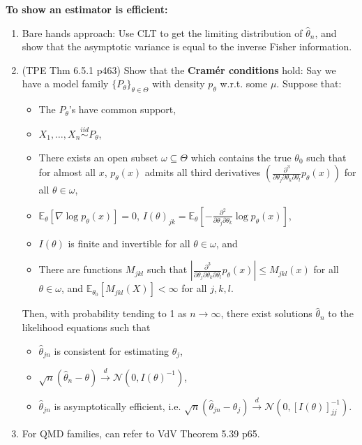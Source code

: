\documentclass[twoside]{article}
\newcommand{\dis}{\displaystyle}
\newcommand\bbE{\mathbb{E}}
\newcommand\calN{\mathcal{N}}
\newcommand\om{\omega}
\def\t{\theta}
\newcommand\T{\Theta}
\newcommand\cd{\stackrel{d}{\goesto}}
\newcommand\goesto{\rightarrow}
\begin{document}
\textbf{To show an estimator is efficient:}
\begin{enumerate}
\item Bare hands approach: Use CLT to get the limiting distribution of $\hat{\t}_n$, and show that the asymptotic variance is equal to the inverse Fisher information.

\item (TPE Thm 6.5.1 p463) Show that the \textbf{Cram\'{e}r conditions} hold: Say we have a model family $\{ P_\t\}_{\t \in \T}$ with density $p_\t$ w.r.t. some $\mu$. Suppose that: 
\begin{itemize}
\item The $P_\t$'s have common support, 
\item $X_1, \dots, X_n \stackrel{iid}{\sim} P_\t$,
\item There exists an open subset $\om \subseteq \T$ which contains the true $\t_0$ such that for almost all $x$, $p_\t(x)$ admits all third derivatives $\left( \dis\frac{\partial^3}{\partial \t_j \partial \t_k \partial \t_l} p_\t(x) \right)$ for all $\t \in \om$,
\item $\bbE_\t \left[ \nabla \log p_\t(x) \right] = 0$, $I(\t)_{jk} = \bbE_\t \left[ -\dis\frac{\partial^2}{\partial \t_j \partial \t_k} \log p_\t(x) \right]$,
\item $I(\t)$ is finite and invertible for all $\t \in \om$, and
\item There are functions $M_{jkl}$ such that $\left| \dis\frac{\partial^3}{\partial \t_j \partial \t_k \partial \t_l} p_\t(x) \right| \leq M_{jkl}(x)$ for all $\t \in \om$, and $\bbE_{\t_0} [M_{jkl}(X)] < \infty$ for all $j,k,l$.
\end{itemize}
Then, with probability tending to 1 as $n \goesto \infty$, there exist solutions $\hat{\t}_n$ to the likelihood equations such that
\begin{itemize}
\item $\hat{\t}_{jn}$ is consistent for estimating $\t_j$,
\item $\sqrt{n}(\hat{\t}_n - \t) \cd \calN (0, I(\t)^{-1})$,
\item $\hat{\t}_{jn}$ is asymptotically efficient, i.e. $\sqrt{n} (\hat{\t}_{jn} - \t_j) \cd \calN(0, [I(\t)]_{jj}^{-1})$.
\end{itemize}

\item For QMD families, can refer to VdV Theorem 5.39 p65.

\end{enumerate}
\end{document}
